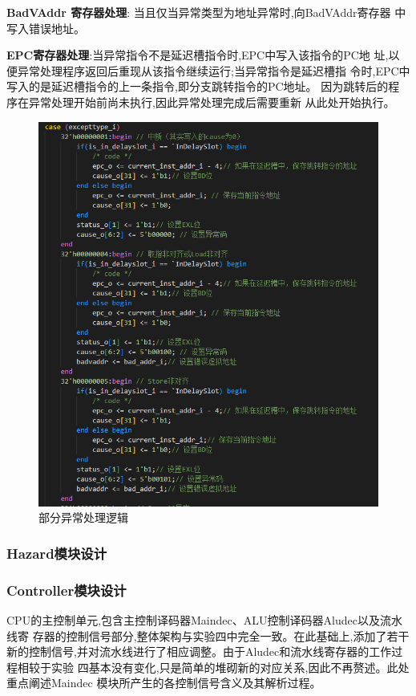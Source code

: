 \textbf{BadVAddr 寄存器处理}: 当且仅当异常类型为地址异常时,向BadVAddr寄存器 中写入错误地址。

\textbf{EPC寄存器处理}:当异常指令不是延迟槽指令时,EPC中写入该指令的PC地 址,以便异常处理程序返回后重现从该指令继续运行;当异常指令是延迟槽指 令时,EPC中写入的是延迟槽指令的上一条指令,即分支跳转指令的PC地址。 因为跳转后的程序在异常处理开始前尚未执行,因此异常处理完成后需要重新 从此处开始执行。 
\begin{figure}
\centering
\includegraphics[width=0.5\linewidth]{image/p8.png}
\caption{部分异常处理逻辑}
\label{fig:enter-label}
\end{figure}
\subsubsection{Hazard模块设计}
\subsubsection{Controller模块设计}

CPU的主控制单元,包含主控制译码器Maindec、ALU控制译码器Aludec以及流水线寄 存器的控制信号部分,整体架构与实验四中完全一致。在此基础上,添加了若干新的控制信号,并对流水线进行了相应调整。由于Aludec和流水线寄存器的工作过程相较于实验 四基本没有变化,只是简单的堆砌新的对应关系,因此不再赘述。此处重点阐述Maindec 模块所产生的各控制信号含义及其解析过程。 


